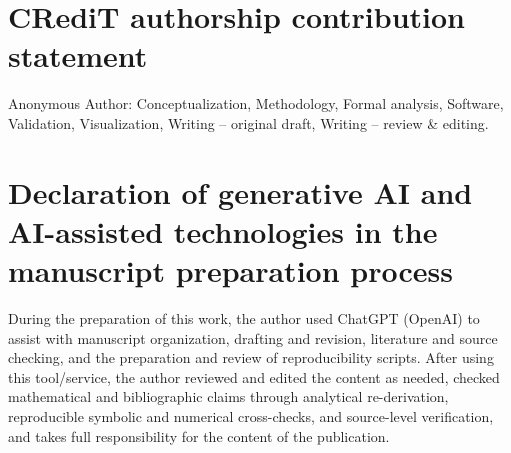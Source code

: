 \section*{CRediT authorship contribution statement}
Anonymous Author: Conceptualization, Methodology, Formal analysis, Software, Validation, Visualization, Writing -- original draft, Writing -- review \& editing.

\section*{Declaration of generative AI and AI-assisted technologies in the manuscript preparation process}
During the preparation of this work, the author used ChatGPT (OpenAI) to assist with manuscript organization, drafting and revision, literature and source checking, and the preparation and review of reproducibility scripts. After using this tool/service, the author reviewed and edited the content as needed, checked mathematical and bibliographic claims through analytical re-derivation, reproducible symbolic and numerical cross-checks, and source-level verification, and takes full responsibility for the content of the publication.
